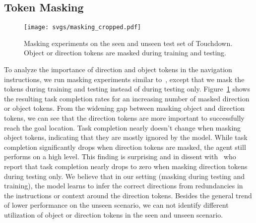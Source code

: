 \documentclass[11pt]{article}
\begin{document}
\subsection{Token Masking}
\begin{figure}
\centering
  \texttt{[image: svgs/masking\_cropped.pdf]}
  \caption{Masking experiments on the seen and unseen test set of Touchdown. Object or direction tokens are masked during training and testing.}
  \label{fig:masking}
\end{figure}
To analyze the importance of direction and object tokens in the navigation instructions, we run masking experiments similar to~\citet{what_really_matters}, except that we mask the tokens during training and testing instead of during testing only. Figure~\ref{fig:masking} shows the resulting task completion rates for an increasing number of masked direction or object tokens. From the widening gap between masking object and direction tokens, we can see that the direction tokens are more important to successfully reach the goal location. Task completion nearly doesn't change when masking object tokens, indicating that they are mostly ignored by the model. While task completion significantly drops when direction tokens are masked, the agent still performs on a high level. This finding is surprising and in dissent with~\citet{what_really_matters} who report that task completion nearly drops to zero when masking direction tokens during testing only. We believe that in our setting (masking during testing and training), the model learns to infer the correct directions from redundancies in the instructions or context around the direction tokens. Besides the general trend of lower performance on the unseen scenario, we can not identify different utilization of object or direction tokens in the seen and unseen scenario.
\end{document}
